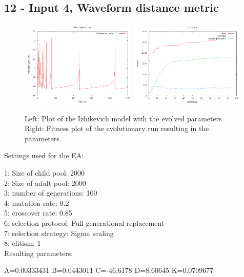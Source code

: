 \documentclass[11pt]{article}
\begin{document}
\subsection*{12 - Input 4, Waveform distance metric}

\begin{figure}
\begin{center}
\mbox{\includegraphics[width=0.49\textwidth]{images/12-res.png}}
\mbox{\includegraphics[width=0.49\textwidth]{images/12-fit.png}}
\end{center}
\caption{Left: Plot of the Izhikevich model with the evolved parameters\\
Right: Fitness plot of the evolutionary run resulting in the parameters.}
\label{fig:12}
\end{figure}

Settings used for the EA:

1: Size of child pool: 2000\\
2: Size of adult pool: 2000\\
3: number of generations: 100\\
4: mutation rate: 0.2\\
5: crossover rate: 0.85\\
6: selection protocol: Full generational replacement\\
7: selection strategy: Sigma scaling\\
8: elitism: 1\\

Resulting parameters:

A=0.00333431 B=0.0443011 C=-46.6178 D=8.60645 K=0.0709677
\end{document}
